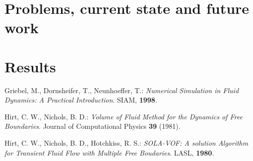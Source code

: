 \documentclass[a4paper, 12pt]{article}
\begin{document}
\section{Problems, current state and future work}\label{sec:prob_state_future}

\section{Results}\label{sec:results}

\begin{thebibliography}{99}
Griebel, M., Dornsheifer, T., Neunhoeffer, T.: \emph{Numerical Simulation in
Fluid Dynamics: A Practical Introduction}. SIAM, {\bf 1998}.

Hirt, C. W., Nichols, B. D.: \emph{Volume of Fluid Method for the Dynamics of Free Boundaries}. Journal of Computational Physics {\bf 39} (1981).

Hirt, C. W., Nichols, B. D., Hotchkiss, R. S.: \emph{SOLA-VOF: A solution Algorithm for Transient Fluid Flow with Multiple Free Boudaries}. LASL, {\bf 1980}.
\end{thebibliography}
\end{document}
